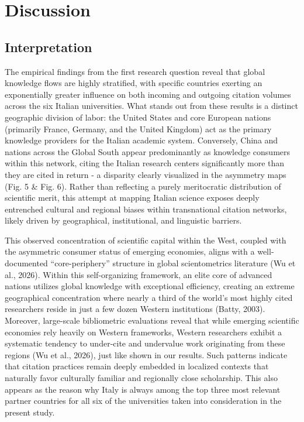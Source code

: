 \documentclass[year=2026]{cup-journal}
\begin{document}
\newpage
\section{Discussion}

\subsection{Interpretation}

The empirical findings from the first research question reveal that global knowledge flows are highly stratified, with specific countries exerting an exponentially greater influence on both incoming and outgoing citation volumes across the six Italian universities. What stands out from these results is a distinct geographic division of labor: the United States and core European nations (primarily France, Germany, and the United Kingdom) act as the primary knowledge providers for the Italian academic system. Conversely, China and nations across the Global South appear predominantly as knowledge consumers within this network, citing the Italian research centers significantly more than they are cited in return - a disparity clearly visualized in the asymmetry maps (Fig. 5 \& Fig. 6). Rather than reflecting a purely meritocratic distribution of scientific merit, this attempt at mapping Italian science exposes deeply entrenched cultural and regional biases within transnational citation networks, likely driven by geographical, institutional, and linguistic barriers.

This observed concentration of scientific capital within the West, coupled with the asymmetric consumer status of emerging economies, aligns with a well-documented “core-periphery” structure in global scientometrics literature (Wu et al., 2026). Within this self-organizing framework, an elite core of advanced nations utilizes global knowledge with exceptional efficiency, creating an extreme geographical concentration where nearly a third of the world’s most highly cited researchers reside in just a few dozen Western institutions (Batty, 2003). Moreover, large-scale bibliometric evaluations reveal that while emerging scientific economies rely heavily on Western frameworks, Western researchers exhibit a systematic tendency to under-cite and undervalue work originating from these regions (Wu et al., 2026), just like shown in our results. Such patterns indicate that citation practices remain deeply embedded in localized contexts that naturally favor culturally familiar and regionally close scholarship. This also appears as the reason why Italy is always among the top three most relevant partner countries for all six of the universities taken into consideration in the present study.
\end{document}
